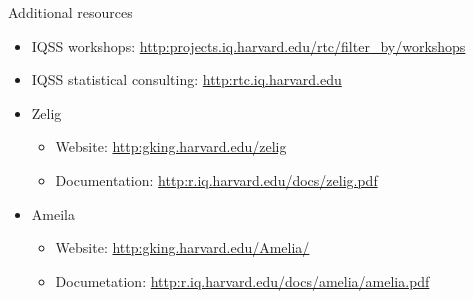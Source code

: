 \documentclass[table,smaller]{beamer}
\begin{document}
\begin{frame}[label=sec-7-2]{Additional resources}
\begin{itemize}
\item IQSS workshops: \url{http:projects.iq.harvard.edu/rtc/filter_by/workshops}
\item IQSS statistical consulting: \url{http:rtc.iq.harvard.edu}

\item Zelig
\begin{itemize}
\item Website: \url{http:gking.harvard.edu/zelig}
\item Documentation: \url{http:r.iq.harvard.edu/docs/zelig.pdf}
\end{itemize}
\item Ameila
\begin{itemize}
\item Website: \url{http:gking.harvard.edu/Amelia/}
\item Documetation: \url{http:r.iq.harvard.edu/docs/amelia/amelia.pdf}
\end{itemize}
\end{itemize}
\end{frame}
\end{document}
